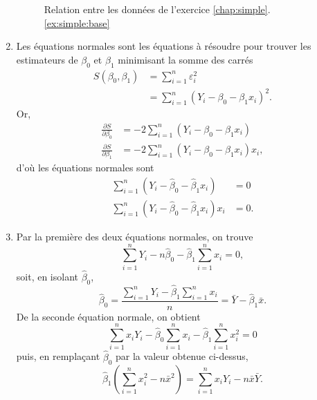 \begin{solution}{2.1}
\begin{enumerate}
\begin{figure}
\begin{knitrout}
\end{knitrout}
        \caption{Relation entre les données de l'exercice
          \ref{chap:simple}.\ref{ex:simple:base}}
        \label{fig:simple:base}
      \end{figure}
    \item Les équations normales sont les équations à résoudre pour
      trouver les estimateurs de $\beta_0$ et $\beta_1$ minimisant la
      somme des carrés
      \begin{align*}
        S(\beta_0, \beta_1)
        &=\sum_{i = 1}^n \varepsilon^2_i \\
        &=\sum_{i = 1}^n \left(Y_i-\beta_0-\beta_1x_i\right)^2.
      \end{align*}
      Or,
      \begin{align*}
        \frac{\partial S}{\partial \beta_0}
        &= -2 \sum_{i=1}^n (Y_i - \beta_0 - \beta_1 x_i) \\
        \frac{\partial S}{\partial \beta_1}
        &= -2 \sum_{i=1}^n (Y_i - \beta_0 - \beta_1 x_i) x_i,
      \end{align*}
      d'où les équations normales sont
      \begin{align*}
        \sum_{i=1}^n (Y_i - \hat{\beta}_0 - \hat{\beta}_1 x_i) &= 0 \\
        \sum_{i=1}^n (Y_i - \hat{\beta}_0 - \hat{\beta}_1 x_i) x_i &= 0.
      \end{align*}
    \item Par la première des deux équations normales, on trouve
      \begin{displaymath}
        \sum_{i=1}^nY_i-n\hat{\beta}_0-\hat{\beta}_1\sum_{i=1}^nx_i = 0,
      \end{displaymath}
      soit, en isolant $\hat{\beta}_0$,
      \begin{displaymath}
        \hat{\beta}_0=\frac{\sum_{i=1}^nY_i-\hat{\beta}_1\sum_{i=1}^nx_i}{n}=\bar{Y}-\hat{\beta}_1\bar{x}.
      \end{displaymath}
      De la seconde équation normale, on obtient
      \begin{displaymath}
        \sum_{i=1}^n x_i Y_i -
        \hat{\beta}_0 \sum_{i=1}^n x_i -
        \hat{\beta}_1 \sum_{i=1}^n x_i^2 = 0
      \end{displaymath}
      puis, en remplaçant $\hat{\beta}_0$ par la valeur obtenue ci-dessus,
      \begin{displaymath}
        \hat{\beta}_1
        \left(
          \sum_{i=1}^n x_i^2 - n \bar{x}^2
        \right) =
        \sum_{i=1}^n x_i Y_i - n \bar{x} \bar{Y}.

\end{displaymath}
\end{enumerate}
\end{solution}
